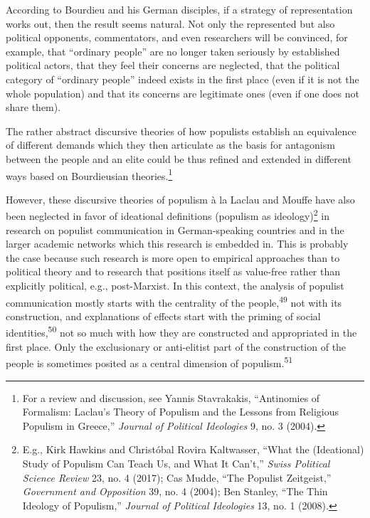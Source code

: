 \documentclass{tufte-handout}
\begin{document}
According to Bourdieu and his German disciples, if a strategy of
representation works out, then the result seems natural. Not only the
represented but also political opponents, commentators, and even
researchers will be convinced, for example, that ``ordinary people'' are
no longer taken seriously by established political actors, that they
feel their concerns are neglected, that the political category of
``ordinary people'' indeed exists in the first place (even if it is not
the whole population) and that its concerns are legitimate ones (even if
one does not share them).

The rather abstract discursive theories of how populists establish an
equivalence of different demands which they then articulate as the basis
for antagonism between the people and an elite could be thus refined and
extended in different ways based on Bourdieusian theories.\footnote{For
  a review and discussion, see Yannis Stavrakakis, ``Antinomies of
  Formalism: Laclau's Theory of Populism and the Lessons from Religious
  Populism in Greece,'' \emph{Journal of Political Ideologies} 9, no. 3
  (2004).}

However, these discursive theories of populism à la Laclau and Mouffe
have also been neglected in favor of ideational definitions (populism as
ideology)\footnote{E.g., Kirk Hawkins and Christóbal Rovira Kaltwasser,
  ``What the (Ideational) Study of Populism Can Teach Us, and What It
  Can't,'' \emph{Swiss Political Science Review} 23, no. 4 (2017); Cas
  Mudde, ``The Populist Zeitgeist,'' \emph{Government and Opposition}
  39, no. 4 (2004); Ben Stanley, ``The Thin Ideology of Populism,''
  \emph{Journal of Political Ideologies} 13, no. 1 (2008).} in research
on populist communication in German-speaking countries and in the larger
academic networks which this research is embedded in. This is probably
the case because such research is more open to empirical approaches than
to political theory and to research that positions itself as value-free
rather than explicitly political, e.g., post-Marxist. In this context,
the analysis of populist communication mostly starts with the centrality
of the people,\textsuperscript{49} not with its
construction, and explanations of effects start with the priming of
social identities,\textsuperscript{50}
not so much with how they are constructed and appropriated in the first
place. Only the exclusionary or anti-elitist part of the construction of
the people is sometimes posited as a central dimension of
populism.\textsuperscript{51}
\end{document}
